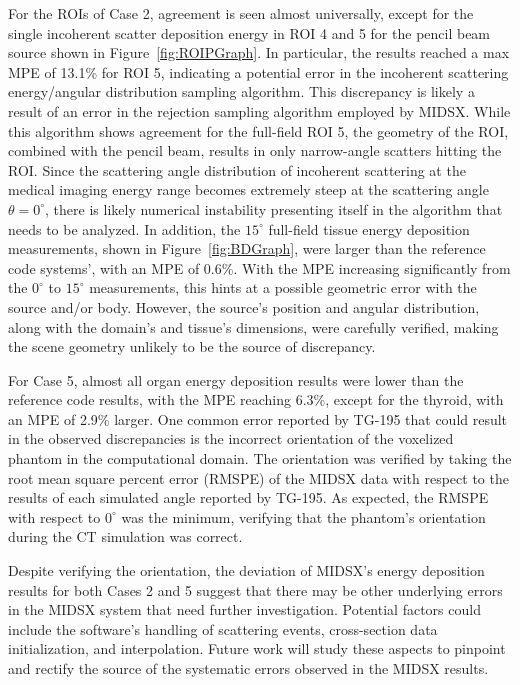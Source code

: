\par For the ROIs of Case 2, agreement is seen almost universally, except for the single incoherent scatter deposition energy in ROI 4 and 5 for the pencil beam source shown in Figure~\ref{fig:ROIPGraph}. In particular, the results reached a max MPE of 13.1\% for ROI 5, indicating a potential error in the incoherent scattering energy/angular distribution sampling algorithm. This discrepancy is likely a result of an error in the rejection sampling algorithm employed by MIDSX. While this algorithm shows agreement for the full-field ROI 5, the geometry of the ROI, combined with the pencil beam, results in only narrow-angle scatters hitting the ROI. Since the scattering angle distribution of incoherent scattering at the medical imaging energy range becomes extremely steep at the scattering angle $\theta = 0^\circ$, there is likely numerical instability presenting itself in the algorithm that needs to be analyzed. In addition, the $15^\circ$ full-field tissue energy deposition measurements, shown in Figure~\ref{fig:BDGraph}, were larger than the reference code systems', with an MPE of 0.6\%. With the MPE increasing significantly from the $0^\circ$ to $15^\circ$ measurements, this hints at a possible geometric error with the source and/or body. However, the source's position and angular distribution, along with the domain's and tissue's dimensions, were carefully verified, making the scene geometry unlikely to be the source of discrepancy.

\par For Case 5, almost all organ energy deposition results were lower than the reference code results, with the MPE reaching 6.3\%, except for the thyroid, with an MPE of 2.9\% larger. One common error reported by TG-195 that could result in the observed discrepancies is the incorrect orientation of the voxelized phantom in the computational domain. The orientation was verified by taking the root mean square percent error (RMSPE) of the MIDSX data with respect to the results of each simulated angle reported by TG-195. As expected, the RMSPE with respect to $0^\circ$ was the minimum, verifying that the phantom's orientation during the CT simulation was correct.

\par Despite verifying the orientation, the deviation of MIDSX's energy deposition results for both Cases 2 and 5 suggest that there may be other underlying errors in the MIDSX system that need further investigation. Potential factors could include the software's handling of scattering events, cross-section data initialization, and interpolation. Future work will study these aspects to pinpoint and rectify the source of the systematic errors observed in the MIDSX results.


